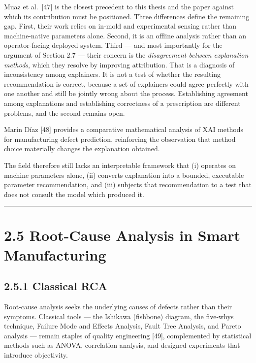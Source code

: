 Muaz et al.~{[}47{]} is the closest precedent to this thesis and the paper against which its contribution must be positioned. Three differences define the remaining gap. First, their work relies on in-mold and experimental sensing rather than machine-native parameters alone. Second, it is an offline analysis rather than an operator-facing deployed system. Third --- and most importantly for the argument of Section 2.7 --- their concern is the \emph{disagreement between explanation methods}, which they resolve by improving attribution. That is a diagnosis of inconsistency among explainers. It is not a test of whether the resulting recommendation is correct, because a set of explainers could agree perfectly with one another and still be jointly wrong about the process. Establishing agreement among explanations and establishing correctness of a prescription are different problems, and the second remains open.

Marín Díaz {[}48{]} provides a comparative mathematical analysis of XAI methods for manufacturing defect prediction, reinforcing the observation that method choice materially changes the explanation obtained.

The field therefore still lacks an interpretable framework that (i) operates on machine parameters alone, (ii) converts explanation into a bounded, executable parameter recommendation, and (iii) subjects that recommendation to a test that does not consult the model which produced it.

\begin{center}\rule{0.5\linewidth}{0.5pt}\end{center}

\hypertarget{root-cause-analysis-in-smart-manufacturing}{%
\section{2.5 Root-Cause Analysis in Smart Manufacturing}\label{root-cause-analysis-in-smart-manufacturing}}

\hypertarget{classical-rca}{%
\subsection{2.5.1 Classical RCA}\label{classical-rca}}

Root-cause analysis seeks the underlying causes of defects rather than their symptoms. Classical tools --- the Ishikawa (fishbone) diagram, the five-whys technique, Failure Mode and Effects Analysis, Fault Tree Analysis, and Pareto analysis --- remain staples of quality engineering {[}49{]}, complemented by statistical methods such as ANOVA, correlation analysis, and designed experiments that introduce objectivity.

